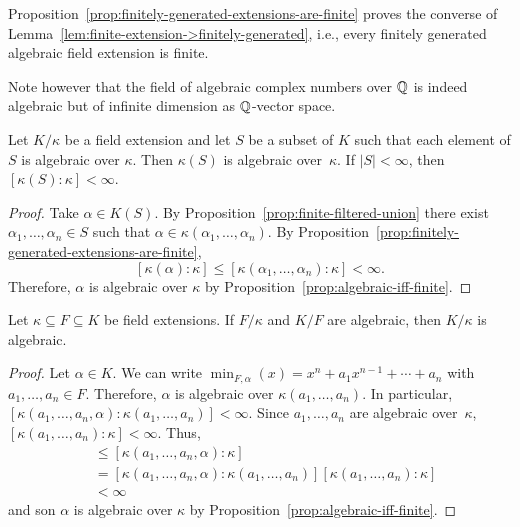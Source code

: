 \begin{rem}
    Proposition~\ref{prop:finitely-generated-extensions-are-finite} proves the converse of Lemma~\ref{lem:finite-extension->finitely-generated}, i.e., every finitely generated algebraic field extension is finite.

    Note however that the field of algebraic complex numbers over $\mathbb{Q}$ is indeed algebraic but of infinite dimension as $\mathbb{Q}$-vector space.
\end{rem}

\begin{cor}\label{cor:algebraic-generators}
    Let\/ $K/\kappa$ be a field extension and let\/ $S$ be a subset of\/ $K$ such that each element of\/ $S$ is algebraic over\/ $\kappa$. Then\/ $\kappa(S)$ is algebraic over\/~$\kappa$. If\/ $|S|<\infty$, then\/ $[\kappa(S):\kappa]<\infty$.
\end{cor}

\begin{proof}
    Take $\alpha\in K(S)$. By Proposition~\ref{prop:finite-filtered-union} there exist $\alpha_1,\dots,\alpha_n\in S$ such that $\alpha\in\kappa(\alpha_1,\dots,\alpha_n)$. By Proposition~\ref{prop:finitely-generated-extensions-are-finite}, 
    $$
        [\kappa(\alpha):\kappa]
            \le[\kappa(\alpha_1,\dots,\alpha_n):\kappa]<\infty.
    $$
    Therefore, $\alpha$ is algebraic over $\kappa$ by Proposition~\ref{prop:algebraic-iff-finite}.
\end{proof}

\begin{thm}\label{thm:algebraic-transitivity}
    Let\/ $\kappa\subseteq F\subseteq K$ be field extensions. If\/ $F/\kappa$ and\/ $K/F$ are algebraic, then\/ $K/\kappa$ is algebraic.
\end{thm}

\begin{proof}
    Let $\alpha\in K$. We can write $\min_{F,\alpha}(x)=x^n+a_1x^{n-1}+\cdots+a_n$ with $a_1,\dots,a_n\in F$. Therefore, $\alpha$ is algebraic over $\kappa(a_1,\dots,a_n)$. In particular, $[\kappa(a_1,\dots,a_n,\alpha):\kappa(a_1,\dots,a_n)]<\infty$. Since $a_1,\dots,a_n$ are algebraic over~$\kappa$, $[\kappa(a_1,\dots,a_n):\kappa]<\infty$. Thus,
    \begin{align*}
        [\kappa(\alpha):\kappa]&\le [\kappa(a_1,\dots,a_n,\alpha):\kappa]\\
            &= [\kappa(a_1,\dots,a_n,\alpha):\kappa(a_1,\dots,a_n)]
            [\kappa(a_1,\dots,a_n):\kappa]\\
            &< \infty
    \end{align*}
    and son $\alpha$ is algebraic over $\kappa$ by Proposition~\ref{prop:algebraic-iff-finite}.
\end{proof}

